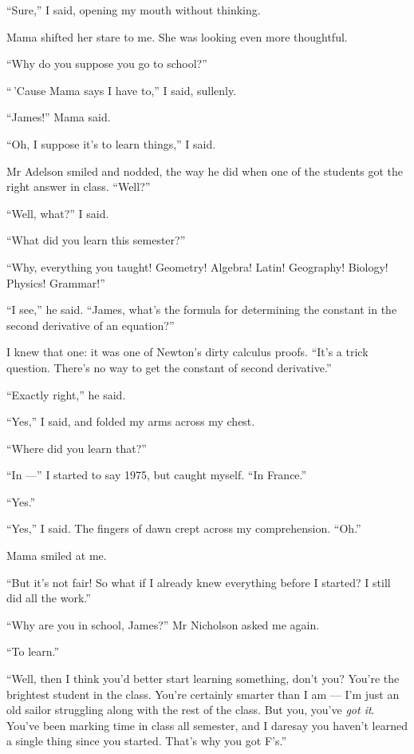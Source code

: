 ``Sure,'' I said, opening my mouth without thinking.

Mama shifted her stare to me. She was looking even more
thoughtful.

``Why do you suppose you go to school?''

``\,'Cause Mama says I have to,'' I said, sullenly.

``James!'' Mama said.

``Oh, I suppose it's to learn things,'' I said.

Mr Adelson smiled and nodded, the way he did when one of the
students got the right answer in class. ``Well?''

``Well, what?'' I said.

``What did you learn this semester?''

``Why, everything you taught! Geometry! Algebra! Latin! Geography! Biology! 
Physics! Grammar!''

``I see,'' he said.
``James, what's the formula for determining the constant in the second 
derivative of an equation?''

I knew that one: it was one of Newton's dirty calculus proofs.
``It's a trick question. There's no way to get the constant of second 
derivative.''

``Exactly right,'' he said.

``Yes,'' I said, and folded my arms across my chest.

``Where did you learn that?''

``In ---'' I started to say 1975, but caught myself.
``In France.''

``Yes.''

``Yes,'' I said. The fingers of dawn crept across my comprehension.
``Oh.''

Mama smiled at me.

``But it's not fair! So what if I already knew everything before I started? I 
still did all the work.''

``Why are you in school, James?'' Mr Nicholson asked me again.

``To learn.''

``Well, then I think you'd better start learning something, don't you? You're 
the brightest student in the class. You're certainly smarter than I am --- I'm 
just an old sailor struggling along with the rest of the class. But you, you've 
\emph{got it}. You've been marking time in class all semester, and I daresay 
you haven't learned a single thing since you started. That's why you got F's.''

